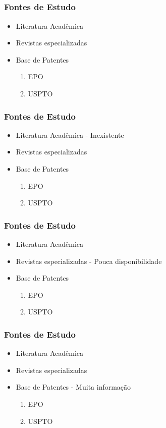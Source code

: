 \documentclass{beamer}
\begin{document}
\subsection{}
\begin{frame}
  \frametitle{Fontes de Estudo}
  \begin{itemize}%
    \item Literatura Acadêmica
    \item Revistas especializadas
    \item Base de Patentes
      \begin{enumerate}
        \item EPO
        \item USPTO
      \end{enumerate}
  \end{itemize}
\end{frame}

\begin{frame}
  \frametitle{Fontes de Estudo}
  \begin{itemize}%
    \item Literatura Acadêmica - Inexistente
    \item Revistas especializadas
    \item Base de Patentes
      \begin{enumerate}
        \item EPO
        \item USPTO
      \end{enumerate}
  \end{itemize}
\end{frame}

\begin{frame}
  \frametitle{Fontes de Estudo}
  \begin{itemize}%
    \item Literatura Acadêmica
    \item Revistas especializadas - Pouca disponibilidade
    \item Base de Patentes
      \begin{enumerate}
        \item EPO
        \item USPTO
      \end{enumerate}
  \end{itemize}
\end{frame}

\begin{frame}
  \frametitle{Fontes de Estudo}
  \begin{itemize}%
    \item Literatura Acadêmica
    \item Revistas especializadas
    \item Base de Patentes - Muita informação
      \begin{enumerate}
        \item EPO
        \item USPTO
      \end{enumerate}
  \end{itemize}
\end{frame}
\end{document}
